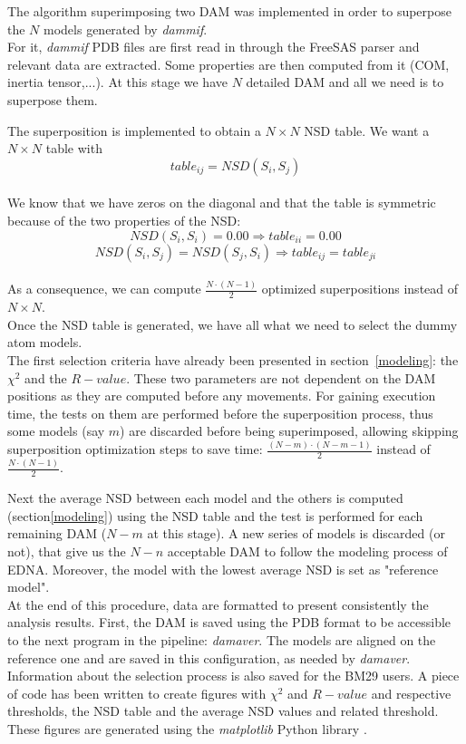 \documentclass[a4paper, 11pt]{report}
\begin{document}
The algorithm superimposing two DAM was implemented in order to 
superpose the $N$ models generated by \textit{dammif}.\\

For it, \textit{dammif} PDB files are first read in through the 
FreeSAS parser and relevant data are extracted. 
Some properties are then computed from it (COM, inertia tensor,...). 
At this stage we have $N$ detailed DAM and all we need is to 
superpose them.

The superposition is implemented to obtain a $N \times N$ NSD table. 
We want a $N \times N$ table with 
\[
table_{ij}=NSD(S_{i},S_{j})
\]\\ 
We know that we have zeros on the diagonal and that the table is 
symmetric because of the two properties of the NSD:
\[
NSD(S_{i},S_{i})=0.00 \Rightarrow table_{ii}=0.00
\]
\[
NSD(S_{i},S_{j}) = NSD(S_{j},S_{i}) \Rightarrow table_{ij}=table_{ji}
\]\\
As a consequence, we can compute $\frac{N \cdot (N-1)}{2}$ optimized 
superpositions instead of $N \times N$.\\

Once the NSD table is generated, we have all what we need to select 
the dummy atom models.\\
The first selection criteria have already been presented in 
section~\ref{modeling}: the $\chi^2$ and the $R-value$. 
These two parameters are not dependent on the DAM positions as they 
are computed before any movements. 
For gaining execution time, the tests on them are performed before 
the superposition process, thus some models (say $m$) are discarded 
before being superimposed, allowing skipping superposition 
optimization steps to save time: $\frac{(N-m) \cdot (N-m-1)}{2}$ 
instead of $\frac{N \cdot (N-1)}{2}$.

Next the average NSD between each model and the others is computed 
(section\ref{modeling}) using the NSD table and the test is performed 
for each remaining DAM ($N-m$ at this stage). 
A new series of models is discarded (or not), that give us the 
$N-n$ acceptable DAM to follow the modeling process of EDNA. 
Moreover, the model with the lowest average NSD is set as "reference 
model".\\

At the end of this procedure, data are formatted to present 
consistently the analysis results. 
First, the DAM is saved using the PDB format to be accessible to 
the next program in the pipeline: \textit{damaver}. 
The models are aligned on the reference one and are saved in this 
configuration, as needed by \textit{damaver}. 
Information about the selection process is also saved for the BM29 
users. 
A piece of code has been written to create figures with $\chi^2$ and 
$R-value$ and respective thresholds, the NSD table and the average NSD 
values and related threshold. 
These figures are generated using the \textit{matplotlib} Python 
library \cite{matplotlib}.\\
\end{document}
